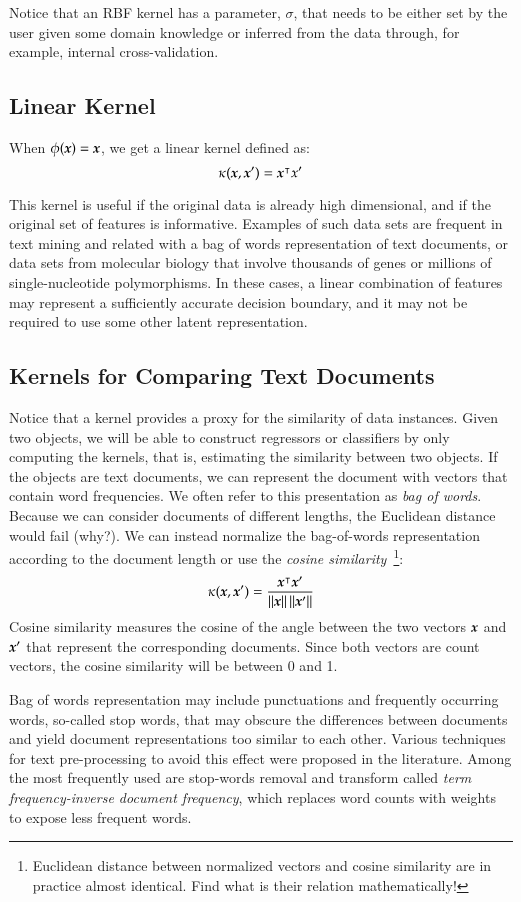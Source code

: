 \begin{refsection}
Notice that an RBF kernel has a parameter, $\sigma$, that needs to be either set by the user given some domain knowledge or inferred from the data through, for example, internal cross-validation.

\subsection*{Linear Kernel}

When $\phi(\boldsymbol{x})=\boldsymbol{x}$, we get a linear kernel defined as:
$$ \kappa(\boldsymbol{x},\boldsymbol{x}')=\boldsymbol{x}^\intercal x' $$

This kernel is useful if the original data is already high dimensional, and if the original set of features is informative. Examples of such data sets are frequent in text mining and related with a bag of words representation of text documents, or data sets from molecular biology that involve thousands of genes or millions of single-nucleotide polymorphisms. In these cases, a linear combination of features may represent a sufficiently accurate decision boundary, and it may not be required to use some other latent representation.

\subsection*{Kernels for Comparing Text Documents}

Notice that a kernel provides a proxy for the similarity of data instances. Given two objects, we will be able to construct regressors or classifiers by only computing the kernels, that is, estimating the similarity between two objects. If the objects are text documents, we can represent the document with vectors that contain word frequencies. We often refer to this presentation as {\em bag of words}. Because we can consider documents of different lengths, the Euclidean distance would fail (why?). We can instead normalize the bag-of-words representation according to the document length or use the {\em cosine similarity}~\footnote{Euclidean distance between normalized vectors and cosine similarity are in practice almost identical. Find what is their relation mathematically!}:
$$ \kappa(\boldsymbol{x}, \boldsymbol{x}')= {\boldsymbol{x}^\intercal \boldsymbol{x}'\over\left\lVert\boldsymbol{x}\right\rVert\left\lVert\boldsymbol{x}'\right\rVert}  $$
Cosine similarity measures the cosine of the angle between the two vectors $\boldsymbol{x}$ and $\boldsymbol{x}'$ that represent the corresponding documents. Since both vectors are count vectors, the cosine similarity will be between 0 and 1. 

Bag of words representation may include punctuations and frequently occurring words, so-called stop words, that may obscure the differences between documents and yield document representations too similar to each other. Various techniques for text pre-processing to avoid this effect were proposed in the literature. Among the most frequently used are stop-words removal and transform called {\em term frequency-inverse document frequency}, which replaces word counts with weights to expose less frequent words.


\end{refsection}
